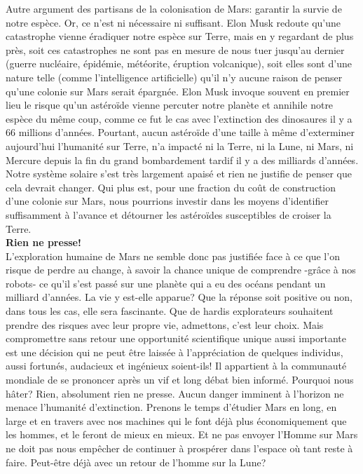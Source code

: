 \documentclass[8pt]{article}
\begin{document}
Autre argument des partisans de la colonisation de Mars: garantir la survie de notre espèce. Or, ce n'est ni nécessaire ni suffisant. Elon Musk redoute qu'une catastrophe vienne éradiquer notre espèce sur Terre, mais en y regardant de plus près, soit ces catastrophes ne sont pas en mesure de nous tuer jusqu'au dernier (guerre nucléaire, épidémie, météorite, éruption volcanique), soit elles sont d'une nature telle (comme l'intelligence artificielle) qu'il n'y aucune raison de penser qu'une colonie sur Mars serait épargnée. 
Elon Musk invoque souvent en premier lieu le risque qu'un astéroïde vienne percuter notre planète et annihile notre espèce du même coup, comme ce fut le cas avec l'extinction des dinosaures il y a 66 millions d'années. Pourtant, aucun astéroïde d'une taille à même d'exterminer aujourd'hui l'humanité sur Terre, n'a impacté ni la Terre, ni la Lune, ni Mars, ni Mercure depuis la fin du grand bombardement tardif il y a des milliards d'années. Notre système solaire s'est très largement apaisé et rien ne justifie de penser que cela devrait changer. Qui plus est, pour une fraction du coût de construction d'une colonie sur Mars, nous pourrions investir dans les moyens d'identifier suffisamment à l'avance et détourner les astéroïdes susceptibles de croiser la Terre.  \\

\textbf{Rien ne presse!}\\

L'exploration humaine de Mars ne semble donc pas justifiée face à ce que l'on risque de perdre au change, à savoir la chance unique de comprendre -grâce à nos robots- ce qu'il s'est passé sur une planète qui a eu des océans pendant un milliard d'années. La vie y est-elle apparue? Que la réponse soit positive ou non, dans tous les cas, elle sera fascinante. 
Que de hardis explorateurs souhaitent prendre des risques avec leur propre vie, admettons, c'est leur choix. Mais compromettre sans retour une opportunité scientifique unique aussi importante est une décision qui ne peut être laissée à l'appréciation de quelques individus, aussi fortunés, audacieux et ingénieux soient-ils! Il appartient à la communauté mondiale de se prononcer après un vif et long débat bien informé.  
Pourquoi nous hâter? Rien, absolument rien ne presse. Aucun danger imminent à l'horizon ne menace l'humanité d'extinction. Prenons le temps d'étudier Mars en long, en large et en travers avec nos machines qui le font déjà plus économiquement que les hommes, et le feront de mieux en mieux. Et ne pas envoyer l'Homme sur Mars ne doit pas nous empêcher de continuer à prospérer dans l'espace où tant reste à faire. Peut-être déjà avec un retour de l'homme sur la Lune? 
\end{document}
